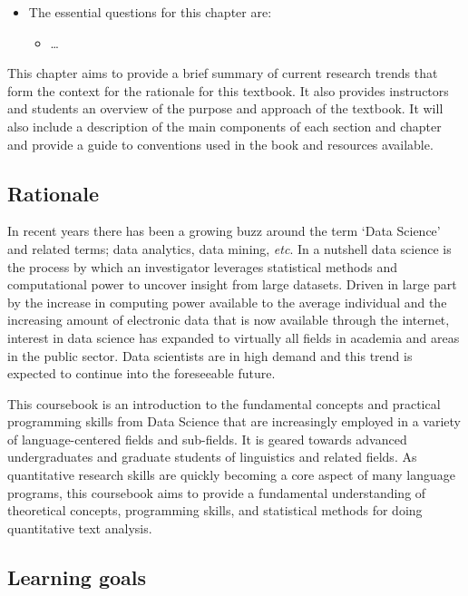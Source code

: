 \documentclass[
]{article}
\providecommand{\tightlist}{%
  \setlength{\itemsep}{0pt}\setlength{\parskip}{0pt}}
\newenvironment{rmdblock}[1]
  {\begin{shaded*}
  \begin{itemize}
  \renewcommand{\labelitemi}{
    \raisebox{-.5\height}[0pt][0pt]{
      {\setkeys{Gin}{width=2em,keepaspectratio}\texttt{[image: assets/images/\#1]}}
    }
  }
  \item
  }
  {
  \end{itemize}
  \end{shaded*}
  }
\newenvironment{rmdkey}
  {\begin{rmdblock}{key}}
  {\end{rmdblock}}
\begin{document}
\begin{rmdkey}
The essential questions for this chapter are:

\begin{itemize}
\tightlist
\item
  \ldots{}
\end{itemize}
\end{rmdkey}

This chapter aims to provide a brief summary of current research trends that form the context for the rationale for this textbook. It also provides instructors and students an overview of the purpose and approach of the textbook. It will also include a description of the main components of each section and chapter and provide a guide to conventions used in the book and resources available.

\hypertarget{rationale}{%
\subsection{Rationale}\label{rationale}}

In recent years there has been a growing buzz around the term `Data Science' and related terms; data analytics, data mining, \emph{etc}. In a nutshell data science is the process by which an investigator leverages statistical methods and computational power to uncover insight from large datasets. Driven in large part by the increase in computing power available to the average individual and the increasing amount of electronic data that is now available through the internet, interest in data science has expanded to virtually all fields in academia and areas in the public sector. Data scientists are in high demand and this trend is expected to continue into the foreseeable future.

This coursebook is an introduction to the fundamental concepts and practical programming skills from Data Science that are increasingly employed in a variety of language-centered fields and sub-fields. It is geared towards advanced undergraduates and graduate students of linguistics and related fields. As quantitative research skills are quickly becoming a core aspect of many language programs, this coursebook aims to provide a fundamental understanding of theoretical concepts, programming skills, and statistical methods for doing quantitative text analysis.

\hypertarget{learning-goals}{%
\subsection{Learning goals}\label{learning-goals}}
\end{document}
